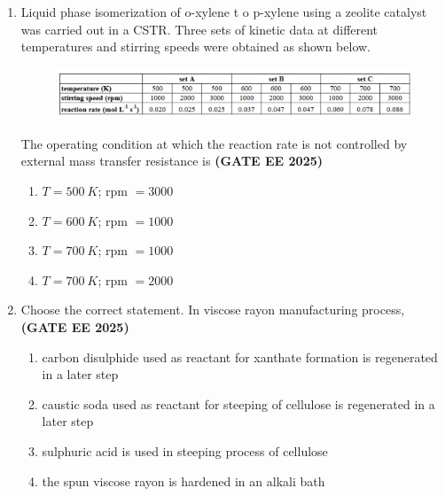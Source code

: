 \documentclass[journal,12pt,onecolumn]{IEEEtran}
\theoremstyle{remark}
\begin{document}
\begin{enumerate}
\begin{enumerate}
\end{enumerate}


\item  Liquid phase isomerization of o-xylene t
	o p-xylene using a zeolite catalyst was carried out in a CSTR. Three sets of kinetic data at different temperatures and stirring speeds were obtained as shown below.
	\begin{figure}
	\begin{center}
\includegraphics[width=1\columnwidth]{figs/16.png}
        \caption{}
	\label{fig16}
\end{center}
	\end{figure}
The operating condition at which the reaction rate is not controlled by external mass transfer resistance is
\hfill \textbf{(GATE EE 2025)} \begin{enumerate}
    \item $T=500~K$; rpm $=3000$
    \item $T=600~K$; rpm $=1000$
    \item $T=700~K$; rpm $=1000$
    \item $T=700~K$; rpm $=2000$
\end{enumerate}


\item Choose the correct statement. In viscose rayon manufacturing process,
\hfill \textbf{(GATE EE 2025)} \begin{enumerate}
    \item carbon disulphide used as reactant for xanthate formation is regenerated in a later step
    \item caustic soda used as reactant for steeping of cellulose is regenerated in a later step
    \item sulphuric acid is used in steeping process of cellulose
    \item the spun viscose rayon is hardened in an alkali bath
\end{enumerate}


\end{enumerate}
\end{document}
